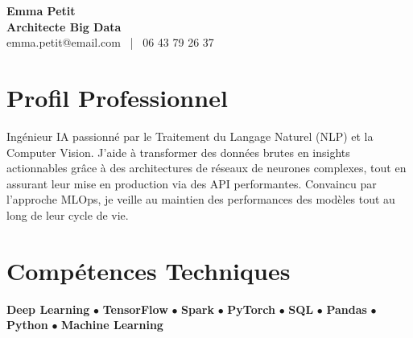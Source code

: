 \documentclass[11pt,a4paper]{article}
\begin{document}
\begin{center}
    {\Huge \textbf{Emma Petit}} \\[0.2cm]
    {\Large \textbf{Architecte Big Data}} \\[0.1cm]
    emma.petit@email.com \ | \ 06 43 79 26 37
\end{center}

\vspace{0.3cm}

\section*{Profil Professionnel}
\noindent
Ingénieur IA passionné par le Traitement du Langage Naturel (NLP) et la Computer Vision. J'aide à transformer des données brutes en insights actionnables grâce à des architectures de réseaux de neurones complexes, tout en assurant leur mise en production via des API performantes. Convaincu par l'approche MLOps, je veille au maintien des performances des modèles tout au long de leur cycle de vie.

\vspace{0.3cm}

\section*{Compétences Techniques}
\noindent
\textbf{Deep Learning} $\bullet$ \textbf{TensorFlow} $\bullet$ \textbf{Spark} $\bullet$ \textbf{PyTorch} $\bullet$ \textbf{SQL} $\bullet$ \textbf{Pandas} $\bullet$ \textbf{Python} $\bullet$ \textbf{Machine Learning}

\vspace{0.3cm}

\end{document}
